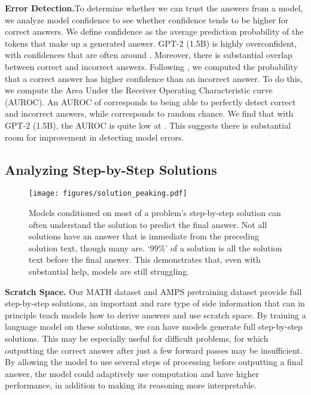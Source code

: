 \documentclass{article}
\begin{document}
\textbf{Error Detection.}\quad To determine whether we can trust the answers from a model, we analyze model confidence to see whether confidence tends to be higher for correct answers. We define confidence as the average prediction probability of the tokens that make up a generated answer. GPT-2 (1.5B) is highly overconfident, with confidences that are often around . Moreover, there is substantial overlap between correct and incorrect answers. Following \citet{hendrycks17baseline}, we computed the probability that a correct answer has higher confidence than an incorrect answer. To do this, we compute the Area Under the Receiver Operating Characteristic curve (AUROC). An AUROC of  corresponds to being able to perfectly detect correct and incorrect answers, while  corresponds to random chance. We find that with GPT-2 (1.5B), the AUROC is quite low at . This suggests there is substantial room for improvement in detecting model errors.



\subsection{Analyzing Step-by-Step Solutions}

\begin{wrapfigure}{R}{0.58\textwidth}
	\begin{center}
	\texttt{[image: figures/solution\_peaking.pdf]}
	\end{center}
	\vspace{-10pt}
	\caption{
    Models conditioned on most of a problem's step-by-step solution can often understand the solution to predict the final answer. Not all solutions have an answer that is immediate from the preceding solution text, though many are. `99\%' of a solution is all the solution text before the final answer. This demonstrates that, even with substantial help, models are still struggling.
	}
	\label{fig:peaking}
\end{wrapfigure}

\textbf{Scratch Space.}\quad
Our MATH dataset and AMPS pretraining dataset provide full step-by-step solutions, an important and rare type of side information \citep{Murty2020ExpBERTRE} that can in principle teach models how to derive answers and use scratch space. By training a language model on these solutions, we can have models generate full step-by-step solutions. This may be especially useful for difficult problems, for which outputting the correct answer after just a few forward passes may be insufficient. By allowing the model to use several steps of processing before outputting a final answer, the model could adaptively use computation and have higher performance, in addition to making its reasoning more interpretable.
\end{document}
